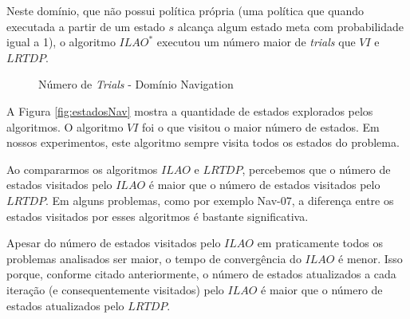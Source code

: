 Neste domínio, que não possui política própria (uma política que quando executada a partir de um estado $s$ alcança algum estado meta com probabilidade igual a 1), o algoritmo $ILAO^*$ executou um número maior de \textit{trials} que $VI$ e $LRTDP$.


\begin{figure}[H]
\centering
{}
\caption{Número de \textit{Trials} - Domínio Navigation}
\label{fig:trialsNav}
\end{figure}


A Figura \ref{fig:estadosNav} mostra a quantidade de estados explorados pelos algoritmos. O algoritmo $VI$ foi o que visitou o maior número de estados. Em nossos experimentos, este algoritmo sempre visita todos os estados do problema.

Ao compararmos os algoritmos $ILAO$ e $LRTDP$, percebemos que o número de estados visitados pelo $ILAO$ é maior que o número de estados visitados pelo $LRTDP$. Em alguns problemas, como por exemplo Nav-07, a diferença entre os estados visitados por esses algoritmos é bastante significativa.

Apesar do número de estados visitados pelo $ILAO$ em praticamente todos os problemas analisados ser maior, o tempo de convergência do $ILAO$ é menor. Isso porque, conforme citado anteriormente, o número de estados atualizados a cada iteração (e consequentemente visitados) pelo $ILAO$ é maior que o número de estados atualizados pelo $LRTDP$.



